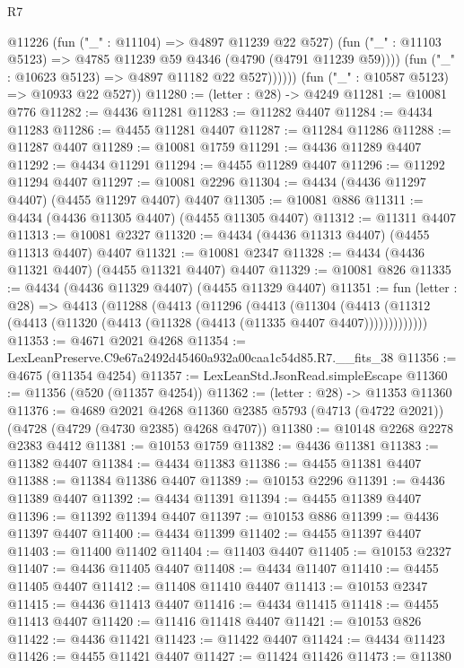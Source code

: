 \begin{lexlean}{R7}
\begin{coremodule}
                @11226
                  (fun ("_" : @11104) => @4897 @11239 @22 @527)
                  (fun ("_" : @11103 @5123) => @4785 @11239 @59 @4346 (@4790 (@4791 @11239 @59))))
                (fun ("_" : @10623 @5123) => @4897 @11182 @22 @527))))))
      (fun ("_" : @10587 @5123) => @10933 @22 @527))
@11280 := (letter : @28) -> @4249
@11281 := @10081 @776
@11282 := @4436 @11281
@11283 := @11282 @4407
@11284 := @4434 @11283
@11286 := @4455 @11281 @4407
@11287 := @11284 @11286
@11288 := @11287 @4407
@11289 := @10081 @1759
@11291 := @4436 @11289 @4407
@11292 := @4434 @11291
@11294 := @4455 @11289 @4407
@11296 := @11292 @11294 @4407
@11297 := @10081 @2296
@11304 := @4434 (@4436 @11297 @4407) (@4455 @11297 @4407) @4407
@11305 := @10081 @886
@11311 := @4434 (@4436 @11305 @4407) (@4455 @11305 @4407)
@11312 := @11311 @4407
@11313 := @10081 @2327
@11320 := @4434 (@4436 @11313 @4407) (@4455 @11313 @4407) @4407
@11321 := @10081 @2347
@11328 := @4434 (@4436 @11321 @4407) (@4455 @11321 @4407) @4407
@11329 := @10081 @826
@11335 := @4434 (@4436 @11329 @4407) (@4455 @11329 @4407)
@11351 := fun (letter : @28) =>
  @4413
    (@11288
      (@4413
        (@11296
          (@4413
            (@11304
              (@4413 (@11312 (@4413 (@11320 (@4413 (@11328 (@4413 (@11335 @4407 @4407)))))))))))))
@11353 := @4671 @2021 @4268
@11354 := LexLeanPreserve.C9e67a2492d45460a932a00caa1c54d85.R7.__fits_38
@11356 := @4675 (@11354 @4254)
@11357 := LexLeanStd.JsonRead.simpleEscape
@11360 := @11356 (@520 (@11357 @4254))
@11362 := (letter : @28) -> @11353 @11360
@11376 := @4689
    @2021
    @4268
    @11360
    @2385
    @5793
    (@4713 (@4722 @2021))
    (@4728 (@4729 (@4730 @2385) @4268 @4707))
@11380 := @10148 @2268 @2278 @2383 @4412
@11381 := @10153 @1759
@11382 := @4436 @11381
@11383 := @11382 @4407
@11384 := @4434 @11383
@11386 := @4455 @11381 @4407
@11388 := @11384 @11386 @4407
@11389 := @10153 @2296
@11391 := @4436 @11389 @4407
@11392 := @4434 @11391
@11394 := @4455 @11389 @4407
@11396 := @11392 @11394 @4407
@11397 := @10153 @886
@11399 := @4436 @11397 @4407
@11400 := @4434 @11399
@11402 := @4455 @11397 @4407
@11403 := @11400 @11402
@11404 := @11403 @4407
@11405 := @10153 @2327
@11407 := @4436 @11405 @4407
@11408 := @4434 @11407
@11410 := @4455 @11405 @4407
@11412 := @11408 @11410 @4407
@11413 := @10153 @2347
@11415 := @4436 @11413 @4407
@11416 := @4434 @11415
@11418 := @4455 @11413 @4407
@11420 := @11416 @11418 @4407
@11421 := @10153 @826
@11422 := @4436 @11421
@11423 := @11422 @4407
@11424 := @4434 @11423
@11426 := @4455 @11421 @4407
@11427 := @11424 @11426
@11473 := @11380

\end{coremodule}
\end{lexlean}

